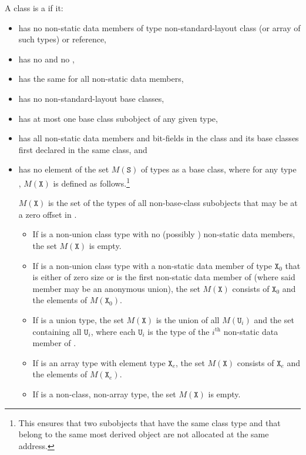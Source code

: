 \pnum
A class  is a  if it:
\begin{itemize}
\item has no non-static data members of type non-standard-layout class
(or array of such types) or reference,

\item has no  and no
,

\item has the same 
for all non-static data members,

\item has no non-standard-layout base classes,

\item has at most one base class subobject of any given type,

\item has all non-static data members and bit-fields in the class and
its base classes first declared in the same class, and

\item has no element of the set $M(\mathtt{S})$ of types
as a base class,
where for any type , $M(\mathtt{X})$ is defined as follows.\footnote{
This ensures that two subobjects that have the same class type and that
belong to the same most derived object are not allocated at the same
address.}
\begin{note}
$M(\mathtt{X})$ is the set of the types of all non-base-class subobjects
that may be at a zero offset in .
\end{note}

\begin{itemize}
\item If  is a non-union class type with no (possibly
) non-static data members, the set
$M(\mathtt{X})$ is empty.

\item If  is a non-union class type with a non-static data
member of type $\mathtt{X}_0$
that is either of zero size or
is the first non-static data member of 
(where said member may be an anonymous union),
the set $M(\mathtt{X})$ consists of $\mathtt{X}_0$ and the elements of
$M(\mathtt{X}_0)$.

\item If  is a union type, the set $M(\mathtt{X})$ is
the union of all $M(\mathtt{U}_i)$ and the set containing all $\mathtt{U}_i$,
where each $\mathtt{U}_i$ is the type of the $i^\text{th}$ non-static data member
of .

\item If  is an array type with element type $\mathtt{X}_e$,
the set $M(\mathtt{X})$ consists of $\mathtt{X}_e$
and the elements of $M(\mathtt{X}_e)$.

\item If  is a non-class, non-array type, the set $M(\mathtt{X})$ is empty.
\end{itemize}
\end{itemize}

